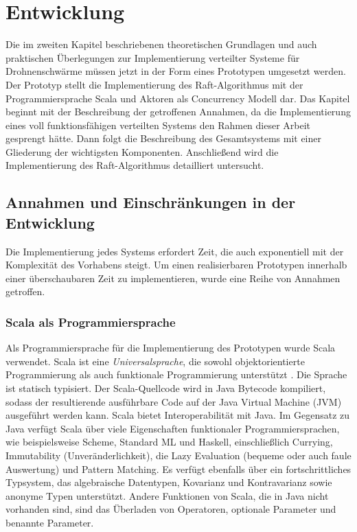 \chapter{Entwicklung}
\label{cha:Entwicklung}

Die im zweiten Kapitel beschriebenen theoretischen Grundlagen und auch praktischen Überlegungen zur Implementierung verteilter Systeme für Drohnenschwärme müssen jetzt in der Form eines Prototypen umgesetzt werden. Der Prototyp stellt die Implementierung des Raft-Algorithmus mit der Programmiersprache Scala und Aktoren als Concurrency Modell dar. Das Kapitel beginnt mit der Beschreibung der getroffenen Annahmen, da die Implementierung eines voll funktionsfähigen verteilten Systems den Rahmen dieser Arbeit gesprengt hätte. Dann folgt die Beschreibung des Gesamtsystems mit einer Gliederung der wichtigsten Komponenten. Anschließend wird die Implementierung des Raft-Algorithmus detailliert untersucht.

\section{Annahmen und Einschränkungen in der Entwicklung}

Die Implementierung jedes Systems erfordert Zeit, die auch exponentiell mit der Komplexität des Vorhabens steigt. Um einen realisierbaren Prototypen innerhalb einer überschaubaren Zeit zu implementieren, wurde eine Reihe von Annahmen getroffen.

\subsection{Scala als Programmiersprache}

Als Programmiersprache für die Implementierung des Prototypen wurde Scala verwendet. Scala ist eine \textit{Universalsprache}, die sowohl objektorientierte Programmierung als auch funktionale Programmierung unterstützt \cite{Odersky04anoverview}. Die Sprache ist statisch typisiert. Der Scala-Quellcode wird in Java Bytecode kompiliert, sodass der resultierende ausführbare Code auf der Java Virtual Machine (JVM) ausgeführt werden kann. Scala bietet Interoperabilität mit Java. Im Gegensatz zu Java verfügt Scala über viele Eigenschaften funktionaler Programmiersprachen, wie beispielsweise Scheme, Standard ML und Haskell, einschließlich Currying, Immutability (Unveränderlichkeit), die Lazy Evaluation (bequeme oder auch faule Auswertung) und Pattern Matching. Es verfügt ebenfalls über ein fortschrittliches Typsystem, das algebraische Datentypen, Kovarianz und Kontravarianz sowie anonyme Typen unterstützt. Andere Funktionen von Scala, die in Java nicht vorhanden sind, sind das Überladen von Operatoren, optionale Parameter und benannte Parameter.


